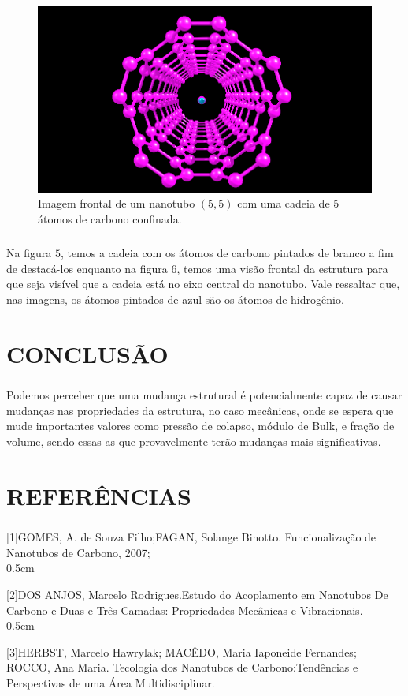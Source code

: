 \documentclass[12pt,a4paper]{report}
\begin{document}
\begin{figure} [!h]
\centering
\includegraphics[scale=0.5]{cntc2.png}
\caption{Imagem frontal de um nanotubo $(5,5)$ com uma cadeia de 5 átomos de carbono confinada.}
\end{figure}

\paragraph{}
Na figura $5$, temos a cadeia com os átomos de carbono pintados de branco a fim de destacá-los enquanto na figura $6$, temos uma visão frontal da estrutura para que seja visível que a cadeia está no eixo central do nanotubo. Vale ressaltar que, nas imagens, os átomos pintados de azul são os átomos de hidrogênio.

\chapter*{CONCLUSÃO}
\paragraph{}
Podemos perceber que uma mudança estrutural é potencialmente capaz de causar mudanças nas propriedades da estrutura, no caso mecânicas, onde se espera que mude importantes valores como pressão de colapso, módulo de Bulk, e fração de volume, sendo essas as que provavelmente terão mudanças mais significativas.


\chapter*{REFERÊNCIAS}
\paragraph{}
[1]GOMES, A. de Souza Filho;FAGAN, Solange Binotto. Funcionalização de Nanotubos de Carbono, 2007;\\{0.5cm}

[2]DOS ANJOS, Marcelo Rodrigues.Estudo do Acoplamento em Nanotubos De Carbono e Duas e Três Camadas: Propriedades Mecânicas e Vibracionais.\\{0.5cm}

[3]HERBST, Marcelo Hawrylak; MACÊDO, Maria Iaponeide Fernandes; ROCCO, Ana Maria. Tecologia dos Nanotubos de Carbono:Tendências e Perspectivas de uma Área Multidisciplinar.
\end{document}
